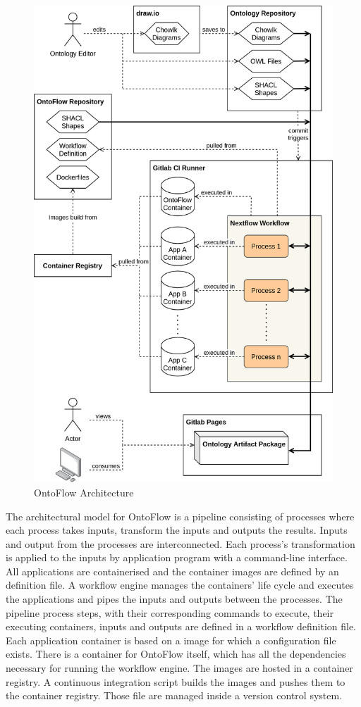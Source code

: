 \documentclass[sigconf]{acmart}
\begin{document}
\begin{figure}[h]
  \centering
  \includegraphics[width=\columnwidth]{architecture.png}
  \caption{OntoFlow Architecture}
  \label{fig:architecture}
\end{figure}

The architectural model for OntoFlow is a pipeline consisting of processes where each process takes inputs, transform the inputs and outputs the results.
Inputs and output from the processes are interconnected.
Each process's transformation is applied to the inputs by application program with a command-line interface.
All applications are containerised and the container images are defined by an definition file.
A workflow engine manages the containers' life cycle and executes the applications and pipes the inputs and outputs between the processes.
The pipeline process steps, with their corresponding commands to execute, their executing containers, inputs and outputs are defined in a workflow definition file.
Each application container is based on a image for which a configuration file exists.
There is a container for OntoFlow itself, which has all the dependencies necessary for running the workflow engine.
The images are hosted in a container registry.
A continuous integration script builds the images and pushes them to the container registry.
Those file are managed inside a version control system.
\end{document}
